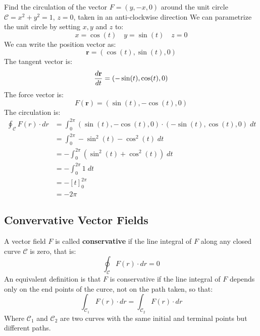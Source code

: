 \documentclass[a4paper, 10pt]{article}
\begin{document}
\begin{examplebox}{Find the circulation of the vector $F = (y, -x, 0)$ around the unit circle $\mathcal{C} = x^2 + y^2 = 1$, $z=0$, taken in an anti-clockwise direction}{}
  We can parametrize the unit circle by setting $x,y$ and $z$ to:
  $$x = \cos(t) \quad y = \sin(t) \quad z = 0$$
  We can write the position vector as:
  $$\mathbf{r} = (\cos(t), \sin(t), 0)$$
  The tangent vector is:
  $$\frac{d\mathbf{r}}{dt} = (-\sin(t), \cos(t), 0)$$
  The force vector is:
  $$F(\mathbf{r}) = (\sin(t), -\cos(t), 0)$$
  The circulation is:
  \begin{align}
    \oint_{\mathcal{C}} F(r) \cdot dr & = \int_0^{2\pi} (\sin(t), -\cos(t), 0) \cdot (-\sin(t), \cos(t), 0) \; dt \\
                                      & = \int_0^{2\pi} -\sin^2(t) - \cos^2(t) \; dt                              \\
                                      & = -\int_0^{2\pi} (\sin^2(t) + \cos^2(t)) \; dt                            \\
                                      & = -\int_0^{2\pi} 1 \; dt                                                  \\
                                      & = -\left[t\right]_0^{2\pi}                                                \\
                                      & = -2\pi
  \end{align}
\end{examplebox}


\subsection{Convervative Vector Fields}
A vector field $F$ is called \textbf{conservative} if the line integral of $F$ along any closed curve $\mathcal{C}$ is zero, that is:
$$\oint_{\mathcal{C}} F(r) \cdot dr = 0$$
An equivalent definition is that $F$ is conservative if the line integral of $F$ depends only on the end points of the curce, not on the path taken, so that:
$$\int_{\mathcal{C}_1} F(r) \cdot dr = \int_{\mathcal{C}_2} F(r)\cdot dr$$
Where $\mathcal{C}_1$ and $\mathcal{C}_2$ are two curves with the same initial and terminal points but different paths.
\end{document}
